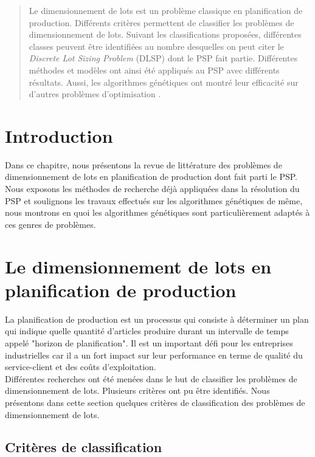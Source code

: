\begin{abstract}
	Le dimensionnement de lots est un problème classique en planification de production. Différents critères \cite{cathy} permettent de classifier les problèmes de dimensionnement de lots. Suivant les classifications proposées, différentes classes peuvent être identifiées au nombre desquelles on peut citer le \emph{Discrete Lot Sizing Problem} (DLSP) dont le PSP fait partie. Différentes méthodes et modèles ont ainsi été appliqués au PSP \cite{ratheil_master} \cite{ceschia} avec différents résultats. Aussi, les algorithmes génétiques ont montré leur efficacité sur d'autres problèmes d'optimisation \cite{Goncalves}.
\end{abstract}

\section*{Introduction}
		
		Dans ce chapitre, nous présentons la revue de littérature des problèmes de dimensionnement de lots en planification de production dont fait parti le PSP. Nous exposons les méthodes de recherche déjà appliquées dans la résolution du PSP et soulignons les travaux effectués sur les algorithmes génétiques de même, nous montrons en quoi les algorithmes génétiques sont particulièrement adaptés à ces genres de problèmes.
		
	\section{Le dimensionnement de lots en planification de production}
	La planification de production est un processus qui consiste à déterminer un plan qui indique quelle quantité d'articles produire durant un intervalle de temps appelé "horizon de planification". Il est un important défi pour les entreprises industrielles car il a un fort impact sur leur performance en terme de qualité du service-client et des coûts d'exploitation. \\
	\hspace*{.5cm} Différentes recherches \cite{dauzere} ont été menées dans le but de classifier les problèmes de dimensionnement de lots. Plusieurs critères ont pu être identifiés. Nous présentons dans cette section quelques critères de classification \cite{cathy} des problèmes de dimensionnement de lots.
	
\subsection{Critères de classification}

